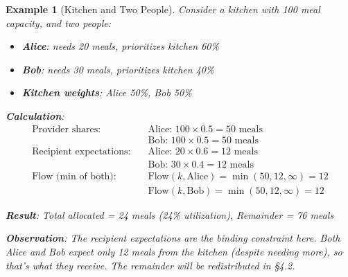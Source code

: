 \documentclass[11pt]{article}
\newtheorem{example}{Example}
\begin{document}
\begin{example}[Kitchen and Two People]
\label{ex:kitchen-basic}
Consider a kitchen with 100 meal capacity, and two people:
\begin{itemize}
\item \textbf{Alice}: needs 20 meals, prioritizes kitchen 60\%
\item \textbf{Bob}: needs 30 meals, prioritizes kitchen 40\%
\item \textbf{Kitchen weights}: Alice 50\%, Bob 50\%
\end{itemize}

\textbf{Calculation}:
\begin{align*}
\text{Provider shares:} \quad & \text{Alice: } 100 \times 0.5 = 50 \text{ meals} \\
& \text{Bob: } 100 \times 0.5 = 50 \text{ meals} \\
\text{Recipient expectations:} \quad & \text{Alice: } 20 \times 0.6 = 12 \text{ meals} \\
& \text{Bob: } 30 \times 0.4 = 12 \text{ meals} \\
\text{Flow (min of both):} \quad & \text{Flow}(k, \text{Alice}) = \min(50, 12, \infty) = 12 \\
& \text{Flow}(k, \text{Bob}) = \min(50, 12, \infty) = 12
\end{align*}

\textbf{Result}: Total allocated = 24 meals (24\% utilization), Remainder = 76 meals

\textbf{Observation}: The recipient expectations are the binding constraint here. Both Alice and Bob expect only 12 meals from the kitchen (despite needing more), so that's what they receive. The remainder will be redistributed in §4.2.
\end{example}
\end{document}
